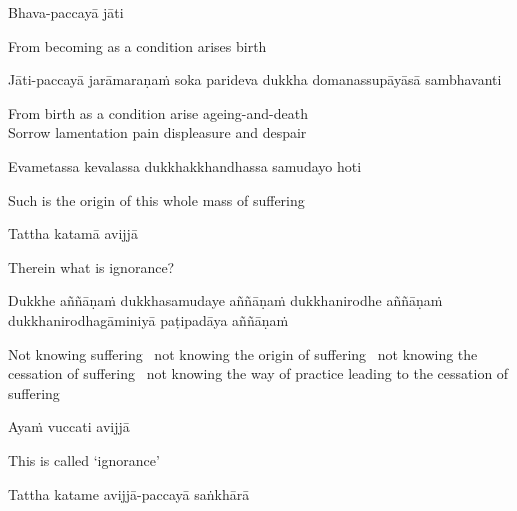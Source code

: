 Bhava-paccayā jāti

\begin{english}
  From becoming as a condition arises birth
\end{english}

\begin{pali-hang}
  Jāti-paccayā jarāmaraṇaṁ soka parideva dukkha domanassupāyāsā sambhavanti
\end{pali-hang}

\begin{english}
  From birth as a condition arise ageing-and-death\\
  Sorrow lamentation pain displeasure and despair
\end{english}

Evametassa kevalassa dukkhakkhandhassa samudayo hoti

\begin{english}
  Such is the origin of this whole mass of suffering
\end{english}

Tattha katamā avijjā

\begin{english}
  Therein what is ignorance?
\end{english}

\begin{pali-hang}
  Dukkhe aññāṇaṁ dukkhasamudaye aññāṇaṁ dukkhanirodhe aññāṇaṁ dukkhanirodhagāminiyā paṭipadāya aññāṇaṁ
\end{pali-hang}

\begin{english-hang-verses}
  Not knowing suffering \breathmark\ not knowing the origin of suffering \breathmark\ not knowing the cessation of suffering \breathmark\ not knowing the way of practice leading to the cessation of suffering
\end{english-hang-verses}

Ayaṁ vuccati avijjā

\begin{english}
  This is called `ignorance'
\end{english}

\begin{pali-hang}
  Tattha katame avijjā-paccayā saṅkhārā
\end{pali-hang}

